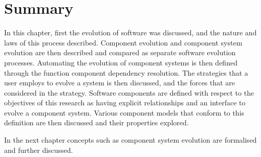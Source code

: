 \section{Summary}
In this chapter, first the evolution of software was discussed, and the nature and laws of this process described.
Component evolution and component system evolution are then described and compared as separate software evolution processes.
Automating the evolution of component systems is then defined through the function component dependency resolution.
The strategies that a user employs to evolve a system is then discussed, and the forces that are considered in the strategy.
Software components are defined with respect to the objectives of this research as having explicit relationships and an interface to evolve a component system.
Various component models that conform to this definition are then discussed and their properties explored.

In the next chapter concepts such as component system evolution are formalised and further discussed.  

